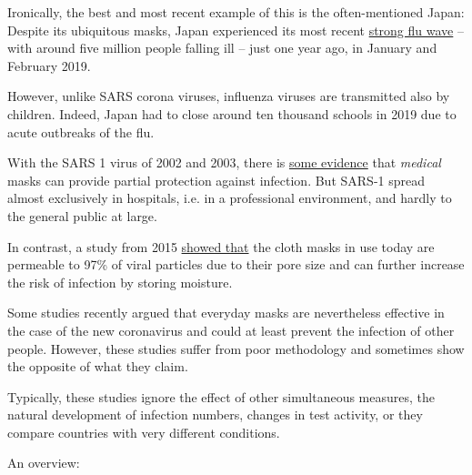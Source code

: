 Ironically, the best and most recent example of this is the
often-mentioned Japan: Despite its ubiquitous masks, Japan experienced
its most recent
\href{https://www.upi.com/Top_News/World-News/2019/02/01/Millions-in-Japan-affected-as-flu-outbreak-grips-country/9191549043797/}{strong
flu wave} -- with around five million people falling ill -- just one
year ago, in January and February 2019.

However, unlike SARS corona viruses, influenza viruses are transmitted
also by children. Indeed, Japan had to close around ten thousand schools
in 2019 due to acute outbreaks of the flu.

With the SARS 1 virus of 2002 and 2003, there is
\href{https://onlinelibrary.wiley.com/doi/10.1111/j.1750-2659.2011.00307.x}{some
evidence} that \emph{medical} masks can provide partial protection
against infection. But SARS-1 spread almost exclusively in hospitals,
i.e. in a professional environment, and hardly to the general public at
large.

In contrast, a study from 2015
\href{https://bmjopen.bmj.com/content/5/4/e006577}{showed that} the
cloth masks in use today are permeable to 97\% of viral particles due to
their pore size and can further increase the risk of infection by
storing moisture.

Some studies recently argued that everyday masks are nevertheless
effective in the case of the new coronavirus and could at least prevent
the infection of other people. However, these studies suffer from poor
methodology and sometimes show the opposite of what they claim.

Typically, these studies ignore the effect of other simultaneous
measures, the natural development of infection numbers, changes in test
activity, or they compare countries with very different conditions.

An overview:

